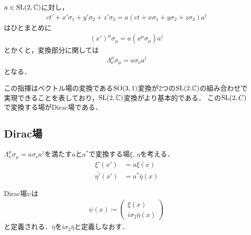 $a\in\mathrm{SL}(2, \mathbb{C})$に対し，
\begin{align}
		ct' + x'\sigma_1 + y'\sigma_2 + z'\sigma_3 = a(ct + x\sigma_1 + y\sigma_2 + z\sigma_3)a^{\dagger}
\end{align}
はひとまとめに
\begin{align}
		(x')^{\mu}\sigma_{\mu} = a(x^{\mu}\sigma_{\mu})a^{\dagger}
\end{align}
とかくと，変換部分に関しては
\begin{align}
		\Lambda^{\mu}_{\nu}\sigma_{\mu} = a\sigma_{\nu}a^{\dagger}
\end{align}
となる．

この指揮はベクトル場の変換である$\mathrm{SO}(3, 1)$変換が2つの$\mathrm{SL}(2. \mathbb{C})$の組み合わせで実現できることを表しており，$\mathrm{SL}(2, \mathbb{C})$変換がより基本的である．
この$\mathrm{SL}(2, C)$で変換する場がDirac場である．

\subsection{Dirac場}
$\Lambda^{\mu}_{\nu}\sigma_{\mu} = a\sigma_{\nu}a^{\dagger} $を満たす$a$と$a^{*}$で変換する場$\xi$, $\eta$を考える．
\begin{align}
		\xi'(x') &= a\xi(x)\\
		\bar{\eta'}(x') &= a^{*}\bar{\eta}(x)
\end{align}

Dirac場$\psi$は
\begin{align}
		\psi(x) \coloneqq 
		\begin{pmatrix}
				\xi(x)\\
				i\sigma_2\bar{\eta}(x)
		\end{pmatrix}
\end{align}
と定義される．$\bar{\eta}$を$i\sigma_2\bar{\eta}$と定義しなおす．

